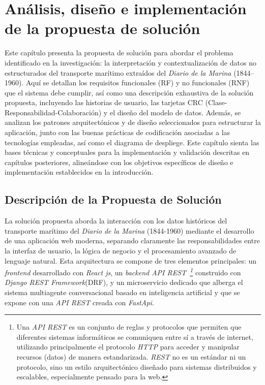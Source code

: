 \chapter{Análisis, diseño e implementación de la propuesta de solución}
\label{chap:chapter2}

Este capítulo presenta la propuesta de solución para abordar el problema identificado en la investigación: la interpretación y contextualización de datos no estructurados del transporte marítimo extraídos del \textit{Diario de la Marina} (1844–1960). Aquí se detallan los requisitos funcionales (RF) y no funcionales (RNF) que el sistema debe cumplir, así como una descripción exhaustiva de la solución propuesta, incluyendo las historias de usuario, las tarjetas CRC (Clase-Responsabilidad-Colaboración) y el diseño del modelo de datos. Además, se analizan los patrones arquitectónicos y de diseño seleccionados para estructurar la aplicación, junto con las buenas prácticas de codificación asociadas a las tecnologías empleadas, así como el diagrama de despliege. Este capítulo sienta las bases técnicas y conceptuales para la implementación y validación descritas en capítulos posteriores, alineándose con los objetivos específicos de diseño e implementación establecidos en la introducción.

\section{Descripción de la Propuesta de Solución}
\label{sec:propuesta_solucion}

La solución propuesta aborda la interacción con los datos históricos del transporte marítimo del \textit{Diario de la Marina} (1844-1960) mediante el desarrollo de una aplicación web moderna, separando claramente las responsabilidades entre la interfaz de usuario, la lógica de negocio y el procesamiento avanzado de lenguaje natural. Esta arquitectura se compone de tres elementos principales: un \textit{frontend} desarrollado con \textit{React js}, un \textit{backend API REST~\footnote{Una \textit{API REST} es un conjunto de reglas y protocolos que permiten que diferentes sistemas informáticos se comuniquen entre sí a través de internet, utilizando principalmente el protocolo \textit{HTTP} para acceder y manipular recursos (datos) de manera estandarizada. \textit{REST} no es un estándar ni un protocolo, sino un estilo arquitectónico diseñado para sistemas distribuidos y escalables, especialmente pensado para la web.}} construido con \textit{Django REST Framework}(DRF), y un microservicio dedicado que alberga el sistema multiagente conversacional basado en inteligencia artificial y que se expone con una \textit{API REST} creada con \textit{FastApi}. 


